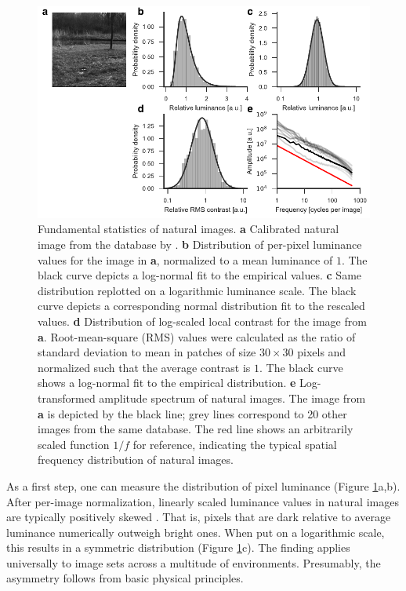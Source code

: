 \begin{figure}
    \centering
    \includegraphics[width=1\textwidth]{graphics/figure_natstats}
    \caption[Fundamental statistics of natural images]
    {Fundamental statistics of natural images. \textbf{a} Calibrated natural image from the database by \citet{vanHateren:1998jt}. \textbf{b} Distribution of per-pixel luminance values for the image in \textbf{a}, normalized to a mean luminance of $1$. The black curve depicts a log-normal fit to the empirical values. \textbf{c} Same distribution replotted on a logarithmic luminance scale. The black curve depicts a corresponding normal distribution fit to the rescaled values. \textbf{d} Distribution of log-scaled local contrast for the image from \textbf{a}. Root-mean-square (RMS) values were calculated as the ratio of standard deviation to mean in patches of size $30 \times 30$ pixels and normalized such that the average contrast is $1$. The black curve shows a log-normal fit to the empirical distribution. \textbf{e} Log-transformed amplitude spectrum of natural images. The image from \textbf{a} is depicted by the black line; grey lines correspond to 20 other images from the same database. The red line shows an arbitrarily scaled function $1/f$ for reference, indicating the typical spatial frequency distribution of natural images.}
    \label{fig:natstats}
\end{figure}

As a first step, one can measure the distribution of pixel luminance (Figure \ref{fig:natstats}a,b). After per-image normalization, linearly scaled luminance values in natural images are typically positively skewed \citep{Laughlin:1981wn,Brady:2000aa,Geisler:2008gu}. That is, pixels that are dark relative to average luminance numerically outweigh bright ones. When put on a logarithmic scale, this results in a symmetric distribution (Figure \ref{fig:natstats}c). The finding applies universally to image sets across a multitude of environments. Presumably, the asymmetry follows from basic physical principles.


